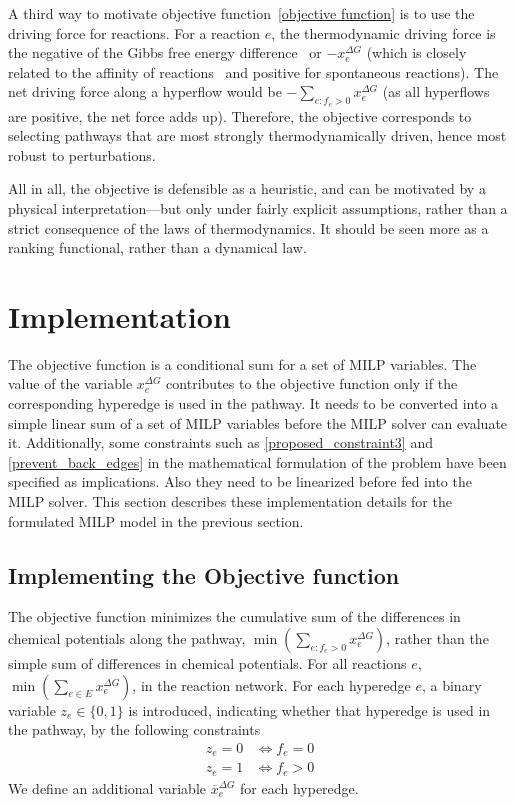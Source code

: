A third way to motivate objective function~\eqref{objective function} is to use the driving force for reactions. For a reaction $e$, the thermodynamic driving force is the negative of the Gibbs free energy difference~\cite{driving_force} or $-x^{\Delta G}_e$ (which is closely related to the affinity of reactions~\cite{affinity} and positive for spontaneous reactions). The net driving force along a hyperflow would be $- \sum_{e\colon f_e > 0} x^{\Delta G}_e$ (as all hyperflows are positive, the net force adds up). Therefore, the objective corresponds to selecting pathways that are most strongly thermodynamically driven, hence most robust to perturbations.  

All in all, the objective is defensible as a heuristic, and can be motivated by a physical interpretation—but only under fairly explicit assumptions, rather than a strict consequence of the laws of thermodynamics. It should be seen more as a ranking functional, rather than a dynamical law.

\section{Implementation}
\label{milp_implement}

The objective function is a conditional sum for a set of MILP variables.
The value of the variable $x^{\Delta G}_e$ contributes to the objective function only if the corresponding hyperedge is used in the pathway.
It needs to be converted into a simple linear sum of a set of MILP variables before the MILP solver can evaluate it.  
Additionally, some constraints such as \eqref{proposed_constraint3} and \eqref{prevent_back_edges} in the mathematical formulation of the problem have been specified as implications. 
Also they need to be linearized before fed into the MILP solver.
This section describes these implementation details for the formulated MILP model in the previous section.

\subsection{Implementing the Objective function}

The objective function minimizes the cumulative sum of the differences in chemical potentials along the pathway,
$\min\left(\sum_{e\colon f_e > 0} x^{\Delta G}_e \right)$,
rather than the simple sum of differences in chemical potentials.
For all reactions $e$, $\min\left(\sum_{e \in E} x^{\Delta G}_e \right)$, in the reaction network. 
For each hyperedge $e$, a binary variable $z_e \in \{0, 1\}$ is introduced,
indicating whether that hyperedge is used in the pathway, by the following constraints
\begin{align}
    z_e = 0 &\iff f_e = 0 \label{biimp3} \\
    z_e = 1 &\iff f_e > 0 \label{biimp4}
\end{align}
We define an additional variable $\overline{x}^{\Delta G}_e$ for each hyperedge.

